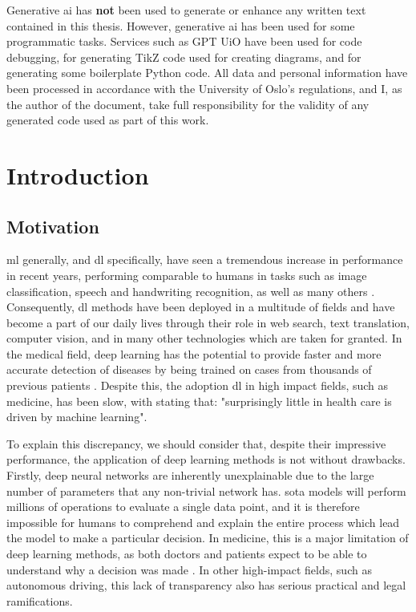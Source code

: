 \documentclass[UKenglish]{uiomasterthesis} %
\theoremstyle{definition}
\begin{document}
\begin{preface}
Generative \ac{ai} has \textbf{not} been used to generate or enhance any written text contained in this thesis. However, generative \ac{ai} has been used for some programmatic tasks. Services such as GPT UiO have been used for code debugging, for generating TikZ code used for creating diagrams, and for generating some boilerplate Python code. All data and personal information have been processed in accordance with the University of Oslo's regulations, and I, as the author of the document, take full responsibility for the validity of any generated code used as part of this work.
\end{preface}

\mainmatter{}



\chapter{Introduction}

\section{Motivation}

\ac{ml} generally, and \ac{dl} specifically, have seen a tremendous increase in performance in recent years, performing comparable to humans in tasks such as image classification, speech and handwriting recognition, as well as many others \cite{performance}. Consequently, \ac{dl} methods have been deployed in a multitude of fields and have become a part of our daily lives through their role in web search, text translation, computer vision, and in many other technologies which are taken for granted. In the medical field, deep learning has the potential to provide faster and more accurate detection of diseases by being trained on cases from thousands of previous patients \cite{xaisurvey}. Despite this, the adoption \ac{dl} in high impact fields, such as medicine, has been slow, with \cite{dlmed} stating that: "surprisingly little in health care is driven by machine learning".


To explain this discrepancy, we should consider that, despite their impressive performance, the application of deep learning methods is not without drawbacks. Firstly, deep neural networks are inherently unexplainable due to the large number of parameters that any non-trivial network has. \ac{sota} models will perform millions of operations to evaluate a single data point, and it is therefore impossible for humans to comprehend and explain the entire process which lead the model to make a particular decision. In medicine, this is a major limitation of deep learning methods, as both doctors and patients expect to be able to understand why a decision was made \cite{tingsim}. In other high-impact fields, such as autonomous driving, this lack of transparency also has serious practical and legal ramifications. %
\end{document}
